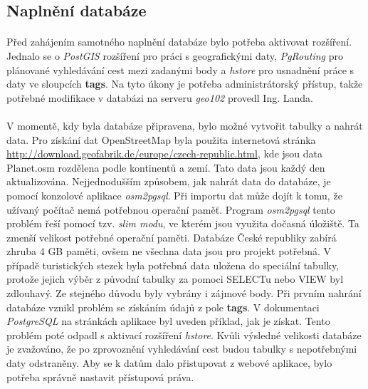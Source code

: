 \documentclass[11pt,a4paper,titlepage,oneside]{book}
\begin{document}

			\subsection{Naplnění databáze}
				\paragraph{} Před zahájením samotného naplnění databáze bylo potřeba aktivovat rozšíření. Jednalo se o \textit{PostGIS} rozšíření pro práci s geografickými daty, \textit{PgRouting} pro plánované vyhledávání cest mezi zadanými body a \textit{hstore} pro usnadnění práce s daty ve sloupcích \textbf{tags}. Na tyto úkony je potřeba administrátorský přístup, takže potřebné modifikace v databázi na serveru \textit{geo102} provedl Ing. Landa.
				\paragraph{} V momentě, kdy byla databáze připravena, bylo možné vytvořit tabulky a nahrát data. Pro získání dat OpenStreetMap byla použita internetová stránka \url{http://download.geofabrik.de/europe/czech-republic.html}, kde jsou data Planet.osm rozdělena podle kontinentů a zemí. Tato data jsou každý den aktualizována. Nejjednodušším způsobem, jak nahrát data do databáze, je pomocí konzolové aplikace \textit{osm2pgsql}. Při importu dat může dojít k tomu, že užívaný počítač nemá potřebnou operační paměť. Program \textit{osm2pgsql} tento problém řeší pomocí tzv. \textit{slim modu}, ve kterém jsou využita dočasná úložiště. Ta zmenší velikost potřebné operační paměti. Databáze České republiky zabírá zhruba 4 GB paměti, ovšem ne všechna data jsou pro projekt potřebná. V případě turistických stezek byla potřebná data uložena do speciální tabulky, protože jejich výběr z původní tabulky za pomoci SELECTu nebo VIEW byl zdlouhavý. Ze stejného důvodu byly vybrány i zájmové body. Při prvním nahrání databáze vznikl problém se získáním údajů z pole \textbf{tags}. V dokumentaci \textit{PostgreSQL} na stránkách aplikace byl uveden příklad, jak je získat. Tento problém poté odpadl s aktivací rozšíření \textit{hstore}. Kvůli výsledné velikosti databáze je zvažováno, že po zprovoznění vyhledávání cest budou tabulky s nepotřebnými daty odstraněny. Aby se k datům dalo přistupovat z webové aplikace, bylo potřeba správně nastavit přístupová práva.
\end{document}
